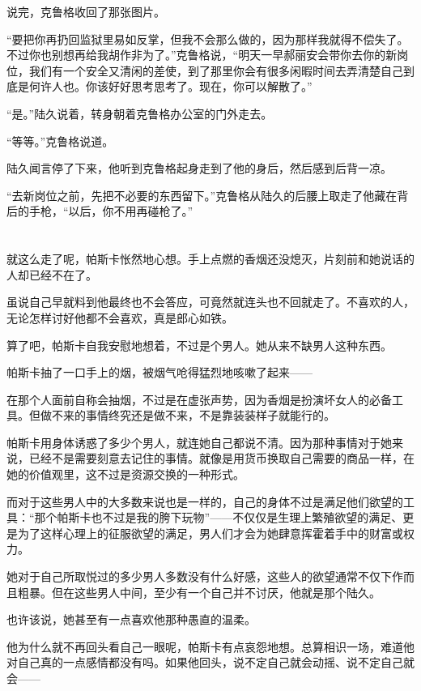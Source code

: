 说完，克鲁格收回了那张图片。

“要把你再扔回监狱里易如反掌，但我不会那么做的，因为那样我就得不偿失了。不过你也别想再给我胡作非为了。”克鲁格说，“明天一早郝丽安会带你去你的新岗位，我们有一个安全又清闲的差使，到了那里你会有很多闲暇时间去弄清楚自己到底是何许人也。你该好好思考思考了。现在，你可以解散了。”

“是。”陆久说着，转身朝着克鲁格办公室的门外走去。

“等等。”克鲁格说道。

陆久闻言停了下来，他听到克鲁格起身走到了他的身后，然后感到后背一凉。

“去新岗位之前，先把不必要的东西留下。”克鲁格从陆久的后腰上取走了他藏在背后的手枪，“以后，你不用再碰枪了。”

\section*{}

就这么走了呢，帕斯卡怅然地心想。手上点燃的香烟还没熄灭，片刻前和她说话的人却已经不在了。

虽说自己早就料到他最终也不会答应，可竟然就连头也不回就走了。不喜欢的人，无论怎样讨好他都不会喜欢，真是郎心如铁。

算了吧，帕斯卡自我安慰地想着，不过是个男人。她从来不缺男人这种东西。

帕斯卡抽了一口手上的烟，被烟气呛得猛烈地咳嗽了起来——

在那个人面前自称会抽烟，不过是在虚张声势，因为香烟是扮演坏女人的必备工具。但做不来的事情终究还是做不来，不是靠装装样子就能行的。

帕斯卡用身体诱惑了多少个男人，就连她自己都说不清。因为那种事情对于她来说，已经不是需要刻意去记住的事情。就像是用货币换取自己需要的商品一样，在她的价值观里，这不过是资源交换的一种形式。

而对于这些男人中的大多数来说也是一样的，自己的身体不过是满足他们欲望的工具：“那个帕斯卡也不过是我的胯下玩物”——不仅仅是生理上繁殖欲望的满足、更是为了这样心理上的征服欲望的满足，男人们才会为她肆意挥霍着手中的财富或权力。

她对于自己所取悦过的多少男人多数没有什么好感，这些人的欲望通常不仅下作而且粗暴。但在这些男人中间，至少有一个自己并不讨厌，他就是那个陆久。

也许该说，她甚至有一点喜欢他那种愚直的温柔。

他为什么就不再回头看自己一眼呢，帕斯卡有点哀怨地想。总算相识一场，难道他对自己真的一点感情都没有吗。如果他回头，说不定自己就会动摇、说不定自己就会——

